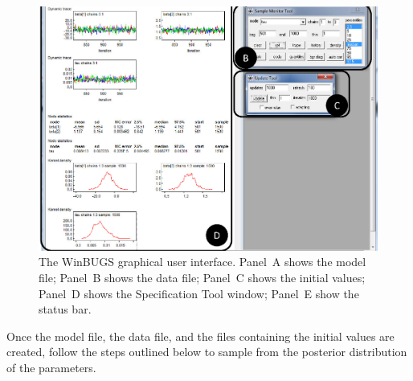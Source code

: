 \begin{figure}[!htb]
\includegraphics[width=1\textwidth]{figs/bi3_WinBUGS_GUI}
\caption{{The WinBUGS graphical user interface.} Panel~A shows the model file; Panel~B shows the data file; Panel~C shows the initial values; Panel~D shows the Specification Tool window; Panel~E show the status bar.}\label{fig:bi3:GUI1}
\end{figure} 

Once the model file, the data file, and the files containing the initial values are created, follow the steps outlined below to sample from the posterior distribution of the parameters.


